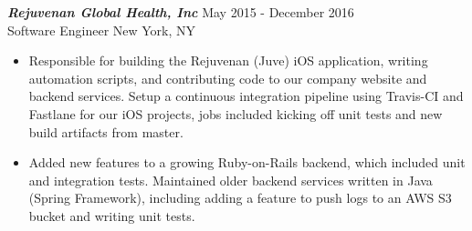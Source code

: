 {\sl \textbf{Rejuvenan Global Health, Inc}} \hfill May 2015 - December 2016 \\
Software Engineer \hfill New York, NY
\begin{itemize}
\item Responsible for building the Rejuvenan (Juve) iOS application, writing automation scripts, and contributing code to our company website and backend services. Setup a continuous integration pipeline using Travis-CI and Fastlane for our iOS projects, jobs included kicking off unit tests and new build artifacts from master.
\item Added new features to a growing Ruby-on-Rails backend, which included unit and integration tests. Maintained older backend services written in Java (Spring Framework), including adding a feature to push logs to an AWS S3 bucket and writing unit tests.
\end{itemize}
